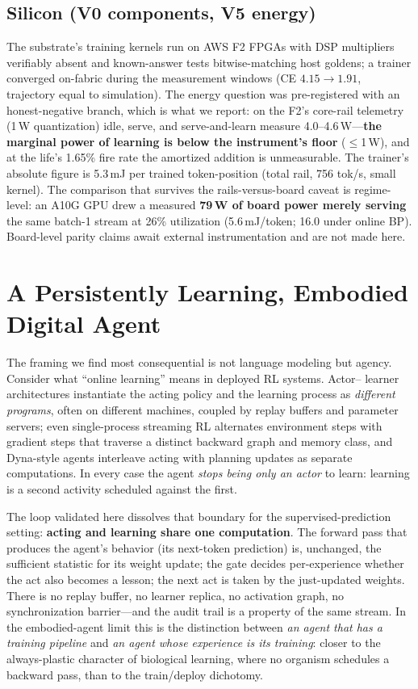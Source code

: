 \documentclass{article}
\begin{document}
\subsection{Silicon (V0 components, V5 energy)}
\label{sec:silicon}
The substrate's training kernels run on AWS F2 FPGAs with DSP multipliers
verifiably absent and known-answer tests bitwise-matching host goldens; a
trainer converged on-fabric during the measurement windows (CE
$4.15\to1.91$, trajectory equal to simulation). The energy question was
pre-registered with an honest-negative branch, which is what we report: on
the F2's core-rail telemetry (1\,W quantization) idle, serve, and
serve-and-learn measure 4.0--4.6\,W---\textbf{the marginal power of
learning is below the instrument's floor} ($\le$1\,W), and at the life's
1.65\% fire rate the amortized addition is unmeasurable. The trainer's
absolute figure is 5.3\,mJ per trained token-position (total rail, 756
tok/s, small kernel). The comparison that survives the rails-versus-board
caveat is regime-level: an A10G GPU drew a measured \textbf{79\,W of board
power merely serving} the same batch-1 stream at 26\% utilization
(5.6\,mJ/token; 16.0 under online BP). Board-level parity claims await
external instrumentation and are not made here.

\section{A Persistently Learning, Embodied Digital Agent}
\label{sec:agent}

The framing we find most consequential is not language modeling but agency.
Consider what ``online learning'' means in deployed RL systems. Actor--%
learner architectures \citep{espeholt2018impala,horgan2018distributed}
instantiate the acting policy and the learning process as \emph{different
programs}, often on different machines, coupled by replay buffers and
parameter servers; even single-process streaming RL
\citep{elsayed2024streaming} alternates environment steps with gradient
steps that traverse a distinct backward graph and memory class, and Dyna-style
agents \citep{sutton1991dyna} interleave acting with planning updates as
separate computations. In every case the agent \emph{stops being only an
actor} to learn: learning is a second activity scheduled against the first.

The loop validated here dissolves that boundary for the supervised-prediction
setting: \textbf{acting and learning share one computation}. The forward pass
that produces the agent's behavior (its next-token prediction) is,
unchanged, the sufficient statistic for its weight update; the gate decides
per-experience whether the act also becomes a lesson; the next act is taken
by the just-updated weights. There is no replay buffer, no learner replica,
no activation graph, no synchronization barrier---and the audit trail is a
property of the same stream. In the embodied-agent limit this is the
distinction between \emph{an agent that has a training pipeline} and
\emph{an agent whose experience is its training}: closer to the
always-plastic character of biological learning, where no organism schedules
a backward pass, than to the train/deploy dichotomy.
\end{document}
